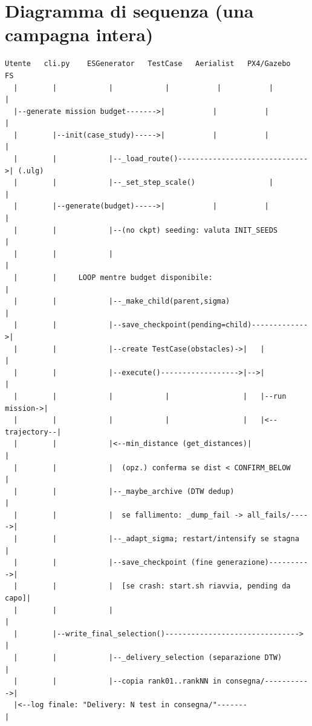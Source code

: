 \documentclass[11pt,a4paper]{report}
\begin{document}
\section{Diagramma di sequenza (una campagna intera)}
\begin{lstlisting}[style=ascii]
Utente   cli.py    ESGenerator   TestCase   Aerialist   PX4/Gazebo   FS
  |        |            |            |           |           |         |
  |--generate mission budget------->|           |           |         |
  |        |--init(case_study)----->|           |           |         |
  |        |            |--_load_route()------------------------------>| (.ulg)
  |        |            |--_set_step_scale()                 |         |
  |        |--generate(budget)----->|           |           |         |
  |        |            |--(no ckpt) seeding: valuta INIT_SEEDS        |
  |        |            |                                              |
  |        |     LOOP mentre budget disponibile:                      |
  |        |            |--_make_child(parent,sigma)                   |
  |        |            |--save_checkpoint(pending=child)------------->|
  |        |            |--create TestCase(obstacles)->|   |           |
  |        |            |--execute()------------------>|-->|           |
  |        |            |            |                 |   |--run mission->|
  |        |            |            |                 |   |<--trajectory--|
  |        |            |<--min_distance (get_distances)|              |
  |        |            |  (opz.) conferma se dist < CONFIRM_BELOW      |
  |        |            |--_maybe_archive (DTW dedup)                   |
  |        |            |  se fallimento: _dump_fail -> all_fails/----->|
  |        |            |--_adapt_sigma; restart/intensify se stagna    |
  |        |            |--save_checkpoint (fine generazione)---------->|
  |        |            |  [se crash: start.sh riavvia, pending da capo]|
  |        |            |                                              |
  |        |--write_final_selection()------------------------------->  |
  |        |            |--_delivery_selection (separazione DTW)        |
  |        |            |--copia rank01..rankNN in consegna/----------->|
  |<--log finale: "Delivery: N test in consegna/"-------              |
\end{lstlisting}
\end{document}

